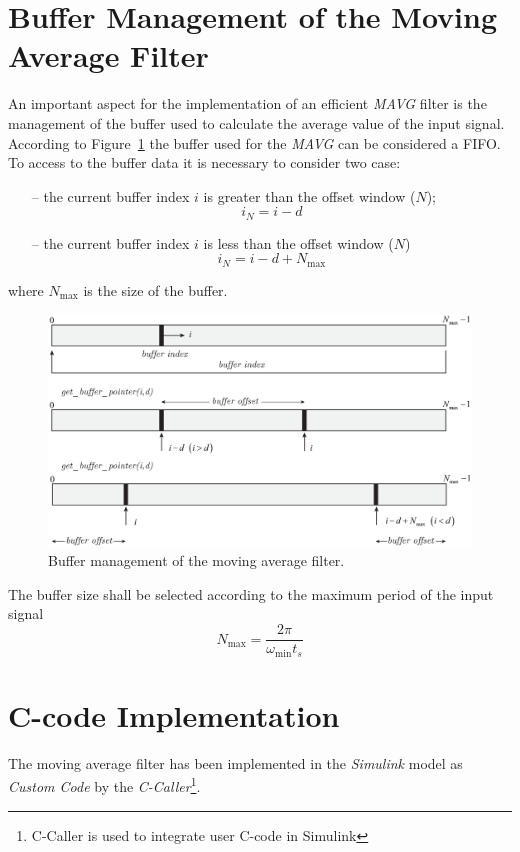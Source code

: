 \documentclass[11pt,a4paper,oneside]{book}
\numberwithin{equation}{section}
\theoremstyle{it}
\theoremstyle{definition}
\begin{document}
\section{Buffer Management of the Moving Average Filter}	
An important aspect for the implementation of an efficient \textit{MAVG} filter is the management of the buffer used to calculate the average value of the input signal. According to Figure~\ref{mavg_flt_fig_3} the buffer used for the \textit{MAVG} can be considered a FIFO. To access to the buffer data it is necessary to consider two case:
\begin{itemize}
	\item[--] the current buffer index $i$ is greater than the offset window ($N$);
	\begin{equation}
		i_N=i-d
	\end{equation}
	\item[--] the current buffer index $i$ is less than the offset window ($N$)
	\begin{equation}
		i_N=i-d+N_\text{max}
	\end{equation}
\end{itemize}
where $N_\text{max}$ is the size of the buffer.
\begin{figure}[H]
	\centering
	\includegraphics[width = 400pt, angle = 0, 
	keepaspectratio]{figures/buffer_management_fig1.eps}
	\captionsetup{width=0.5\textwidth, font=small}
	\caption{Buffer management of the moving average filter.}
	\label{mavg_flt_fig_3}
\end{figure}
The buffer size shall be selected according to the maximum period of the input signal
\begin{equation}
	N_\text{max}=\frac{2\pi}{\omega_\text{min}t_s}
\end{equation}

\section{C-code Implementation}
The moving average filter has been implemented in the \textit{Simulink} model as \textit{Custom Code} by the \textit{C-Caller}\footnote{C-Caller is used to integrate user C-code in Simulink}.
\end{document}
